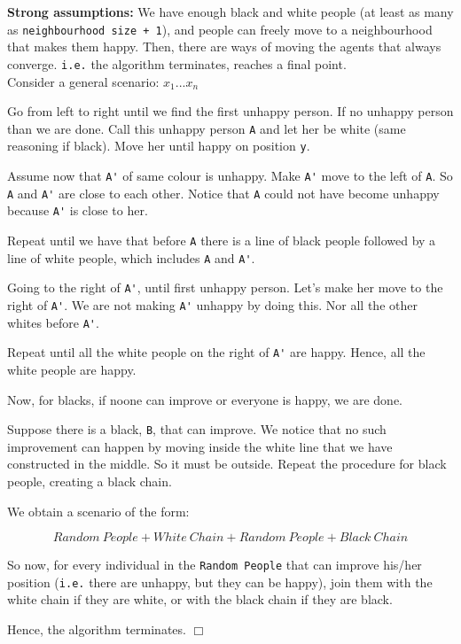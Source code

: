 \documentclass[../main.tex]{subfiles}
\begin{document}
\textbf{Strong assumptions:} We have enough black and white people (at least as many as \verb|neighbourhood size + 1|), and people can freely move to a neighbourhood that makes them happy. Then, there are ways of moving the agents that always converge. \verb|i.e.| the algorithm terminates, reaches a final point.\\


Consider a general scenario: $x_1 ... x_n$

Go from left to right until we find the first unhappy person. If no unhappy person than we are done. Call this unhappy person \verb|A| and let her be white (same reasoning if black). Move her until happy on position \verb|y|. 

Assume now that \verb|A'| of same colour is unhappy. Make \verb|A'| move to the left of \verb|A|. So \verb|A| and \verb|A'| are close to each other. Notice that \verb|A| could not have become unhappy because \verb|A'| is close to her. 

Repeat until we have that before \verb|A| there is a line of black people followed by a line of white people, which includes \verb|A| and \verb|A'|.

Going to the right of \verb|A'|, until first unhappy person. Let's make her move to the right of \verb|A'|. We are not making \verb|A'| unhappy by doing this. Nor all the other whites before \verb|A'|. 

Repeat until all the white people on the right of \verb|A'| are happy. Hence, all the white people are happy.

Now, for blacks, if noone can improve or everyone is happy, we are done.

Suppose there is a black, \verb|B|, that can improve. We notice that no such improvement can happen by moving inside the white line that we have constructed in the middle. So it must be outside. Repeat the procedure for black people, creating a black chain.

We obtain a scenario of the form:

\[ Random\ People + White\ Chain + Random\ People + Black\ Chain\]

So now, for every individual in the \verb|Random People| that can improve his/her position (\verb|i.e.| there are unhappy, but they can be happy), join them with the white chain if they are white, or with the black chain if they are black. 

Hence, the algorithm terminates. $ \Box $

\end{document}
